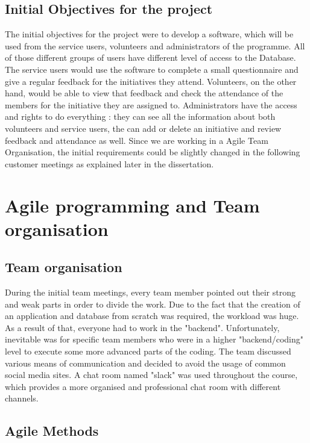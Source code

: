 \documentclass{l3proj}
\begin{document}
\subsection{Initial Objectives for the project}
\label{objectives}

The initial objectives for the project were to develop a software, which will be used from the service users, volunteers and administrators of the programme. All of those different groups of users have different level of access to the Database. The service users would use the software to  complete a small questionnaire and give a regular feedback for the initiatives they attend. Volunteers, on the other hand, would be able to view that feedback and check the attendance of the members for the initiative they are assigned to. Administrators have the access and rights to do everything : they can see all the information about both volunteers and service users, the can add or delete an initiative and review feedback and attendance as well. Since we are working in a Agile Team Organisation, the initial requirements could be slightly changed in the following customer meetings as explained later in the dissertation.

\section{Agile programming and Team organisation}

\subsection{Team organisation}
\label{organisation}

During the initial team meetings, every team member pointed out their strong and weak parts in order to divide the work. Due to the fact that the creation of an application and database from scratch was required, the workload was huge. As a result of that, everyone had to work in the "backend". Unfortunately, inevitable was for specific team members who were in a higher "backend/coding" level to execute some more advanced parts of the coding.
The team discussed various means of communication and decided to avoid the usage of common social media sites. A chat room named "slack" was used throughout the course, which provides a more organised and professional chat room with different channels.

\subsection{Agile Methods}
\label{agile}
\end{document}
